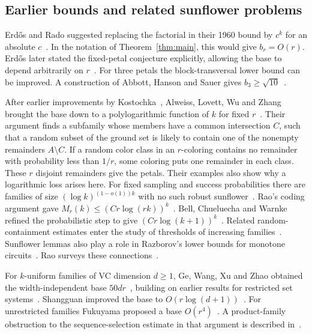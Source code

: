 \subsection{Earlier bounds and related sunflower problems}\label{sec:history}

Erd\H{o}s and Rado suggested replacing the factorial in their 1960
bound by \(c^k\) for an absolute \(c\)~\cite[p.~86]{ER}. In the
notation of Theorem~\ref{thm:main}, this would give \(b_r=O(r)\).
Erd\H{o}s later stated the fixed-petal conjecture explicitly, allowing
the base to depend arbitrarily on \(r\)~\cite[Section~4]{ERstrong}.
For three petals the block-transversal lower bound can be improved.
A construction of Abbott, Hanson and Sauer gives
\(b_3\ge\sqrt{10}\)~\cite{AHS}.

After earlier improvements by Kostochka~\cite{Kostochka}, Alweiss,
Lovett, Wu and Zhang brought the base down to a polylogarithmic
function of \(k\) for fixed \(r\)~\cite{ALWZ}. Their argument finds a
subfamily whose members have a common intersection \(C\), such that
a random subset of the ground set is likely to contain one of the
nonempty remainders \(A\setminus C\). If a random color class in
an \(r\)-coloring contains no remainder with probability less than
\(1/r\), some coloring puts one remainder in each class. These
\(r\) disjoint remainders give the petals. Their examples also show why a logarithmic loss
arises here. For fixed sampling and success probabilities there are
families of size \((\log k)^{(1-o(1))k}\) with no such robust
sunflower~\cite[Section~3]{ALWZ}. Rao's coding argument gave
\(M_r(k)\le (Cr\log(rk))^k\)~\cite{Rao}. Bell, Chueluecha and Warnke
refined the probabilistic step to give \((Cr\log(k+1))^k\)~\cite{BCW}.
Related random-containment estimates enter the study of thresholds of
increasing families~\cite{Thresholds,PP}. Sunflower lemmas also play
a role in Razborov's lower bounds for monotone
circuits~\cite{Razborov}. Rao surveys these connections~\cite{RaoSurvey}.

For \(k\)-uniform families of VC dimension \(d\ge1\), Ge, Wang, Xu and Zhao
obtained the width-independent base \(50dr\)~\cite[Theorem~1.1]{VC},
building on earlier results for restricted set
systems~\cite{FPS,vcsmall}. Shangguan improved the base to
\(O(r\log(d+1))\)~\cite[Corollary~1.4]{Shangguan}. For unrestricted
families Fukuyama proposed a base \(O(r^4)\)~\cite{Fukuyama}.
A product-family obstruction to the sequence-selection estimate in
that argument is described in~\cite{Plasma}.


